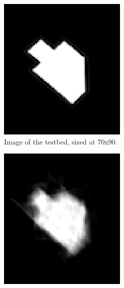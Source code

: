 \documentclass[english]{article}\usepackage[]{graphicx}\usepackage[]{color}
\begin{document}
\begin{figure}[h]
\centering
\begin{subfigure}{.22\textwidth}
  \centering
    \includegraphics[width=1\linewidth]{figures/experimentalresultoriginal}
  \caption{Image of the testbed, sized at 70x90.}
  \vspace{20pt}
  \label{fig:experresorig}
\end{subfigure}%
\hspace{10pt}
\begin{subfigure}{.22\textwidth}
  \centering
    \includegraphics[width=1\linewidth]{figures/experimentalresultsimulation}

\end{subfigure}
\end{figure}
\end{document}
